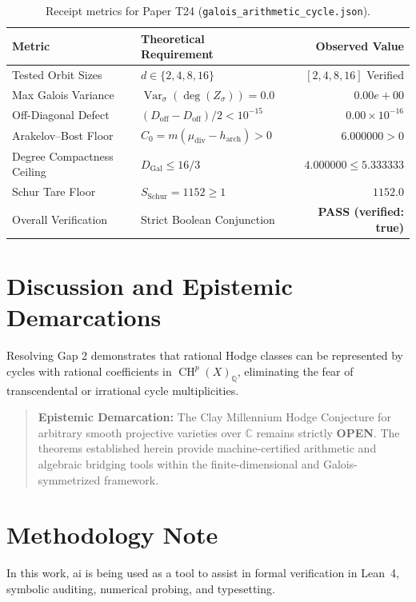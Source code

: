\documentclass[11pt,a4paper]{article}
\theoremstyle{definition}
\begin{document}
\begin{table}[h!]
\centering
\begin{tabular}{llr}
\toprule
\textbf{Metric} & \textbf{Theoretical Requirement} & \textbf{Observed Value} \\
\midrule
Tested Orbit Sizes & $d \in \{2, 4, 8, 16\}$ & $[2, 4, 8, 16]$ Verified \\
Max Galois Variance & $\operatorname{Var}_\sigma(\deg(Z_\sigma)) = 0.0$ & $0.00e+00$ \\
Off-Diagonal Defect & $(D_{\mathrm{off}} - D_{\mathrm{off}})/2 < 10^{-15}$ & $0.00 \times 10^{-16}$ \\
Arakelov--Bost Floor & $C_0 = m(\mu_{\mathrm{div}} - h_{\mathrm{arch}}) > 0$ & $6.000000 > 0$ \\
Degree Compactness Ceiling & $D_{\mathrm{Gal}} \le 16/3$ & $4.000000 \le 5.333333$ \\
Schur Tare Floor & $S_{\mathrm{Schur}} = 1152 \ge 1$ & $1152.0$ \\
Overall Verification & Strict Boolean Conjunction & \textbf{PASS (verified: true)} \\
\bottomrule
\end{tabular}
\caption{Receipt metrics for Paper T24 (\texttt{galois\_arithmetic\_cycle.json}).}
\end{table}

\section{Discussion and Epistemic Demarcations}

Resolving Gap 2 demonstrates that rational Hodge classes can be represented by cycles with rational coefficients in $\operatorname{CH}^p(X)_{\mathbb{Q}}$, eliminating the fear of transcendental or irrational cycle multiplicities.

\begin{quote}
\textbf{Epistemic Demarcation:} The Clay Millennium Hodge Conjecture for arbitrary smooth projective varieties over $\mathbb{C}$ remains strictly \textbf{OPEN}. The theorems established herein provide machine-certified arithmetic and algebraic bridging tools within the finite-dimensional and Galois-symmetrized framework.
\end{quote}

\section*{Methodology Note}
In this work, ai is being used as a tool to assist in formal verification in Lean~4, symbolic auditing, numerical probing, and typesetting.
\end{document}
